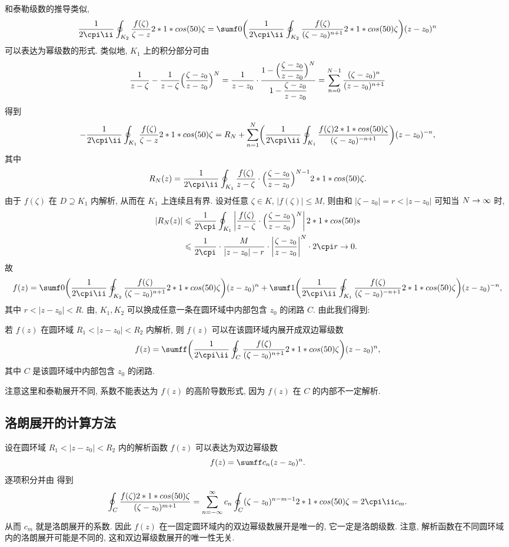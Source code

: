 和泰勒级数的推导类似,
\[
   \frac1{2\cpi\ii}\oint_{K_2}\frac{f(\zeta)}{\zeta-z}\d\zeta
  =\sumf0 \biggl(\frac1{2\cpi\ii}
    \oint_{K_2}\frac{f(\zeta)}{(\zeta-z_0)^{n+1}}\d\zeta
  \biggr)(z-z_0)^n
\]
可以表达为幂级数的形式.
类似地, $K_1$ 上的积分部分可由
\[
   \frac1{z-\zeta}-\frac1{z-\zeta}\Bigl(\frac{\zeta-z_0}{z-z_0}\Bigr)^N
  =\frac1{z-z_0}\cdot\frac{1-\Bigl(\dfrac{\zeta-z_0}{z-z_0}\Bigr)^N}{1-\dfrac{\zeta-z_0}{z-z_0}}
  =\sum_{n=0}^{N-1}\frac{(\zeta-z_0)^n}{(z-z_0)^{n+1}}
\]
得到
\[
  -\frac1{2\cpi\ii}\oint_{K_1}\frac{f(\zeta)}{\zeta-z}\d\zeta
  =R_N+\sum_{n=1}^N\biggl(\frac1{2\cpi\ii}\oint_{K_1}
    \frac{f(\zeta)\d\zeta}{(\zeta-z_0)^{-n+1}}
   \biggr)(z-z_0)^{-n},
\]
其中
\[
  R_N(z)=\frac1{2\cpi\ii}\oint_{K_1}\frac{f(\zeta)}{z-\zeta}\cdot\Bigl(\frac{\zeta-z_0}{z-z_0}\Bigr)^{N-1}\d\zeta.
\]
由于 $f(\zeta)$ 在 $D\supseteq K_1$ 内解析, 从而在 $K_1$ 上连续且有界.
设对任意 $\zeta\in K$, $|f(\zeta)|\le M$, 则由\thmGrowUp 和 $|\zeta-z_0|=r<|z-z_0|$ 可知当 $N\rightarrow \infty$ 时,
\begin{align*}
  |R_N(z)|&\le\frac 1{2\cpi}\oint_{K_1}\abs{\frac{f(\zeta)}{z-\zeta}\cdot\Bigl(\frac{\zeta-z_0}{z-z_0}\Bigr)^N}\d s\\
  &\le\frac 1{2\cpi}\cdot\frac M{|z-z_0|-r}\cdot\abs{\frac{\zeta-z_0}{z-z_0}}^N\cdot 2\cpi r\ra 0.
\end{align*}
故
\[
  f(z)=
    \sumf0 \biggl(\frac1{2\cpi\ii}\oint_{K_2}\frac{f(\zeta)}{(\zeta-z_0)^{n+1}}\d\zeta\biggr)(z-z_0)^n
    +\sumf1 \biggl(\frac1{2\cpi\ii}\oint_{K_1}\frac{f(\zeta)}{(\zeta-z_0)^{-n+1}}\d\zeta\biggr)(z-z_0)^{-n},
\]
其中 $r<|z-z_0|<R$.
由\thmCCC, $K_1,K_2$ 可以换成任意一条在圆环域中内部包含 $z_0$ 的闭路 $C$.
由此我们得到:

\begin{theorem}
  \label{thm:laurent-expansion}
  若 $f(z)$ 在圆环域 $R_1<|z-z_0|<R_2$ 内解析, 则 $f(z)$ 可以在该圆环域内展开成双边幂级数
  \[
    f(z)=\sumff \biggl(\frac1{2\cpi\ii}\oint_C \frac{f(\zeta)}{(\zeta-z_0)^{n+1}}\d\zeta\biggr)(z-z_0)^n,
  \]
  其中 $C$ 是该圆环域中内部包含 $z_0$ 的闭路.
\end{theorem}

注意这里和泰勒展开不同, 系数不能表达为 $f(z)$ 的高阶导数形式, 因为 $f(z)$ 在 $C$ 的内部不一定解析.


\subsection{洛朗展开的计算方法}

设在圆环域 $R_1<|z-z_0|<R_2$ 内的解析函数 $f(z)$ 可以表达为双边幂级数
\[
  f(z)=\sumff c_n(z-z_0)^n.
\]
逐项积分并由 得到
\[
   \oint_C \frac{f(\zeta)\d\zeta}{(\zeta-z_0)^{m+1}}
  =\sum_{n=-\infty}^\infty c_n\oint_C (\zeta-z_0)^{n-m-1}\d\zeta
  =2\cpi\ii c_m.
\]
从而 $c_m$ 就是洛朗展开的系数.
因此 $f(z)$ 在一固定圆环域内的\alert{双边幂级数展开是唯一的, 它一定是洛朗级数}.
注意, 解析函数在不同圆环域内的洛朗展开可能是不同的, 这和双边幂级数展开的唯一性无关.

